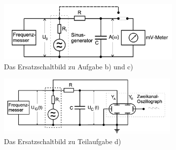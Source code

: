 \begin{figure}
    \centering
    \includegraphics[height=3cm]{esb2}
    \caption{Das Ersatzschaltbild zu Aufgabe b) und c)}
\end{figure}

\begin{figure}
    \centering
    \includegraphics[height=3cm]{esb3}
    \caption{Das Ersatzschaltbild zu Teilaufgabe d)}
\end{figure}